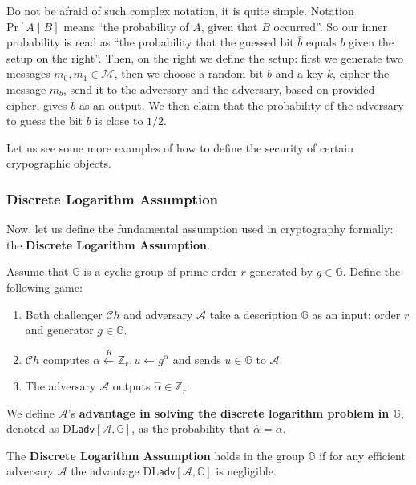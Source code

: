 \documentclass[../lecture-notes.tex]{subfiles}
\begin{document}
Do not be afraid of such complex notation, it is quite simple. Notation $\text{Pr}[A \mid B]$ means ``the probability of $A$, given that $B$ occurred''. So our inner probability is read as ``the probability that the guessed bit $\hat{b}$ equals $b$ given the setup on the right''. Then, on the right we define the setup: first we generate two messages $m_0,m_1 \in \mathcal{M}$, then we choose a random bit $b$ and a key $k$, cipher the message $m_b$, send it to the adversary and the adversary, based on provided cipher, gives $\hat{b}$ as an output. We then claim that the probability of the adversary to guess the bit $b$ is close to $1/2$.

Let us see some more examples of how to define the security of certain crypographic objects.

\subsubsection{Discrete Logarithm Assumption}

Now, let us define the fundamental assumption used in cryptography formally: the \textbf{Discrete Logarithm Assumption}.

\begin{definition}
    Assume that $\mathbb{G}$ is a cyclic group of prime order $r$ generated by $g \in \mathbb{G}$. Define the following game:
    \begin{enumerate}
        \item Both challenger $\mathcal{C}h$ and adversary $\mathcal{A}$ take a description $\mathbb{G}$ as an input: order $r$ and generator $g \in \mathbb{G}$.
        \item $\mathcal{C}h$ computes $\alpha \xleftarrow{R} \mathbb{Z}_r, u \gets g^{\alpha}$ and sends $u \in \mathbb{G}$ to $\mathcal{A}$.
        \item The adversary $\mathcal{A}$ outputs $\hat{\alpha} \in \mathbb{Z}_r$.
    \end{enumerate}

    We define $\mathcal{A}$'s \textbf{advantage in solving the discrete logarithm problem in $\mathbb{G}$}, denoted as $\text{DL}\mathsf{adv}[\mathcal{A},\mathbb{G}]$, as the probability that $\hat{\alpha} = \alpha$.
\end{definition}

\begin{definition}
    The \textbf{Discrete Logarithm Assumption} holds in the group $\mathbb{G}$ if for any efficient adversary $\mathcal{A}$ the advantage $\text{DL}\mathsf{adv}[\mathcal{A},\mathbb{G}]$ is negligible.
\end{definition}
\end{document}
